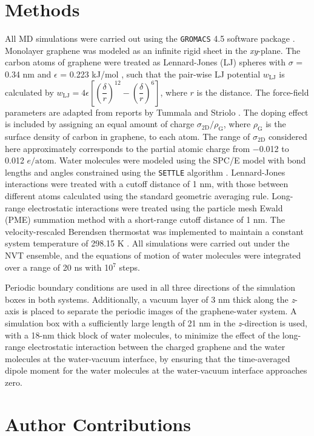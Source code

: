 \section{Methods}
\label{sec:wet-methods}

All MD simulations were carried out
using the \texttt{GROMACS} 4.5 software package
\cite{Hess_2008_gromacs}. Monolayer graphene was modeled as an
infinite rigid sheet in the \textit{xy}-plane.
%
The carbon atoms of graphene
were treated as Lennard-Jones (LJ) spheres with
\(\sigma\) =
0.34 nm and \(\epsilon\) = 0.223 kJ/mol \cite{Cheng_1990}, such that the pair-wise LJ potential $w_{\mathrm{LJ}}$ is calculated by $w_{\mathrm{LJ}} = 4 \epsilon\left[\left(\dfrac{\delta}{r}\right)^{12} - \left(\dfrac{\delta}{r}\right)^{6}\right]$, where $r$ is the distance.
The 
force-field parameters are adapted from reports by Tummala and Striolo
\cite{Tummala_2008_counterion_SDS}.
%
The doping effect is included by assigning an equal amount of charge
\(\sigma_{\mathrm{2D}} / \rho_{\mathrm{G}}\), where
\(\rho_{\mathrm{G}}\) is the surface density of carbon in graphene, to
each atom.
%
The range of \(\sigma_{\mathrm{2D}}\) considered here
approximately corresponds to the partial atomic charge from −0.012 to
0.012 \(e/\mathrm{atom}\).
%
Water molecules were modeled using the SPC/E model
\cite{Berendsen_1987_pair} with bond lengths and angles constrained
using the \texttt{SETTLE} algorithm
\cite{Miyamoto_1992_SHAKE_RATTLE}. Lennard-Jones interactions were
treated with a cutoff distance of 1 nm, with those between different
atoms calculated using the standard geometric averaging
rule. Long-range electrostatic interactions were treated using the
particle mesh Ewald (PME) summation method
\cite{Darden_1993_ewald,Essmann_1995_ewald} with a short-range cutoff
distance of 1 nm. The velocity-rescaled Berendsen thermostat was
implemented to maintain a constant system temperature of 298.15 K
\cite{Bussi_2007}. All simulations were carried out under the NVT
ensemble, and the equations of motion of water molecules were
integrated over a range of 20 ns with 10\(^{\text{7}}\) steps.

Periodic boundary conditions are used in all three directions of the
simulation boxes in both systems. Additionally, a vacuum layer of 3 nm
thick along the \emph{z}-axis is placed to separate the periodic
images of the graphene-water system. A simulation box with a
sufficiently large length of 21 nm in the \emph{z}-direction is used,
with a 18-nm thick block of water molecules, to minimize the effect of
the long-range electrostatic interaction between the charged graphene
and the water molecules at the water-vacuum interface, by ensuring
that the time-averaged dipole moment for the water molecules at the
water-vacuum interface approaches zero.




\section{Author Contributions}
\label{sec:wet-author-contributions}






% 




